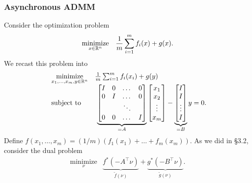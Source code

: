 \documentclass[10pt,mathserif]{beamer}
\begin{document}
\begin{frame}[fragile]
\frametitle{Asynchronous ADMM}
Consider the optimization problem
\begin{align*}
\underset{x\in \mathbb{R}^n}{\mbox{minimize}} \quad \frac{1}{m}\sum_{i=1}^{m} f_i(x) + g(x).
\end{align*}
We recast this problem into
\begin{align}\
\begin{array}{ll}
  \underset{x_1,\dots,x_m,y\in \mathbb{R}^n}{\mbox{minimize}} & \frac{1}{m}\sum_{i=1}^{m} f_i(x_i) + g(y)\\
  \mbox{subject to} &~
  \underbrace{\begin{bmatrix}
          I & 0 & \dots & 0 \\
          0 & I & \dots & 0 \\
           &  & \ddots & \\
          0 & 0 & \dots & I
        \end{bmatrix}}_{=A}
        \begin{bmatrix}
          x_1 \\
          x_2 \\
          \vdots \\
          x_m
        \end{bmatrix}
        -
        \underbrace{
        \begin{bmatrix}
          I \\
          I \\
          \vdots \\
          I
        \end{bmatrix}}_{=B}
        y
        = 0.
        \end{array}
\end{align}
Define $f(x_1,\dots,x_m)=(1/m)(f_1(x_1)+\dots+f_m(x_m))$.
As we did in \S3.2, consider the dual problem
\[
\begin{array}{ll}
  \underset{\nu}{\mbox{minimize}} & \underbrace{f^*(-A^\intercal \nu)}_{\tilde{f}(\nu)}+\underbrace{g^*(-B^\intercal \nu)}_{\tilde{g}(\nu)}.
  \end{array}
\]
\end{frame}
\end{document}
